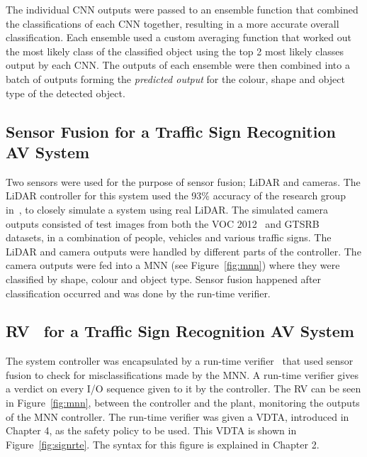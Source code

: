 The individual \ac{CNN} outputs were passed to an ensemble function that combined the classifications of each \ac{CNN} together, resulting in a more accurate overall classification.
Each ensemble used a custom averaging function that worked out the most likely class of the classified object using the top 2 most likely classes output by each \ac{CNN}.
The outputs of each ensemble were then combined into a batch of outputs forming the \textit{predicted output} for the colour, shape and object type of the detected object.

\subsection{Sensor Fusion for a Traffic Sign Recognition AV System}
Two sensors were used for the purpose of sensor fusion; \ac{LiDAR} and cameras.
The \ac{LiDAR} controller for this system used the 93\% accuracy of the research group in~\cite{lidarFusion}, to closely simulate a system using real \ac{LiDAR}.
The simulated camera outputs consisted of test images from both the \ac{VOC} 2012~\cite{pascal-voc-2012} and \ac{GTSRB}~\cite{Stallkamp2012-gtsrb} datasets, in a combination of people, vehicles and various traffic signs.
The \ac{LiDAR} and camera outputs were handled by different parts of the controller.
The camera outputs were fed into a \ac{MNN} (see Figure~\ref{fig:mnn}) where they were classified by shape, colour and object type.
Sensor fusion happened after classification occurred and was done by the run-time verifier.

\subsection{\acf{RV}~\cite{runtime-verify} for a Traffic Sign Recognition AV System}
The system controller was encapsulated by a run-time verifier~\cite{recps} that used sensor fusion to check for misclassifications made by the \ac{MNN}.
A run-time verifier gives a verdict on every I/O sequence given to it by the controller.
The \ac{RV} can be seen in Figure~\ref{fig:mnn}, between the controller and the plant, monitoring the outputs of the \ac{MNN} controller.
The run-time verifier was given a \acf{VDTA}, introduced in Chapter 4, as the safety policy to be used.
This \ac{VDTA} is shown in Figure~\ref{fig:signrte}.
The syntax for this figure is explained in Chapter 2.

